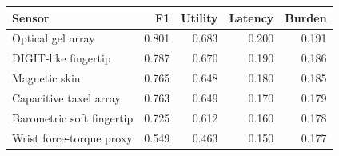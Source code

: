 \begin{tabular}{lrrrr}
\toprule
Sensor & F1 & Utility & Latency & Burden \\
\midrule
Optical gel array & 0.801 & 0.683 & 0.200 & 0.191 \\
DIGIT-like fingertip & 0.787 & 0.670 & 0.190 & 0.186 \\
Magnetic skin & 0.765 & 0.648 & 0.180 & 0.185 \\
Capacitive taxel array & 0.763 & 0.649 & 0.170 & 0.179 \\
Barometric soft fingertip & 0.725 & 0.612 & 0.160 & 0.178 \\
Wrist force-torque proxy & 0.549 & 0.463 & 0.150 & 0.177 \\
\bottomrule
\end{tabular}

